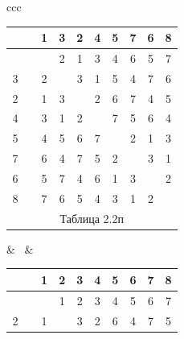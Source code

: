 \begin{center}





\begin{tabular}{ccc}





\begin{tabular}{cccccccccc}


\ & \vline & 1 & 3 & 2 & 4 & 5 & 7 & 6 & 8 \\


\hline


 1 & \vline & \ & 2 & 1 & 3 & 4 & 6 & 5 & 7 \\


3 & \vline & 2 & \ & 3 & 1 & 5 & 4 & 7 & 6 \\


2 & \vline & 1 & 3 & \ & 2 & 6 & 7 & 4 & 5 \\


4 & \vline & 3 & 1 & 2 & \ & 7 & 5 & 6 & 4 \\


5 & \vline & 4 & 5 & 6 & 7 & \ & 2 & 1 & 3 \\


7 & \vline & 6 & 4 & 7 & 5 & 2 & \ & 3 & 1 \\


6 & \vline & 5 & 7 & 4 & 6 & 1 & 3 & \ & 2 \\


8 & \vline & 7 & 6 & 5 & 4 & 3 & 1 & 2 & \ \\


\multicolumn{10}{c}{ Таблица 2.2п}


\end{tabular}





& \ & 





\begin{tabular}{cccccccccc}


\ & \vline & 1 & 2 & 3 & 4 & 5 & 6 & 7 & 8 \\


\hline


 1 & \vline & \ & 1 & 2 & 3 & 4 & 5 & 6 & 7 \\


2 & \vline & 1 & \ & 3 & 2 & 6 & 4 & 7 & 5 \\



\end{tabular}
\end{tabular}
\end{center}
